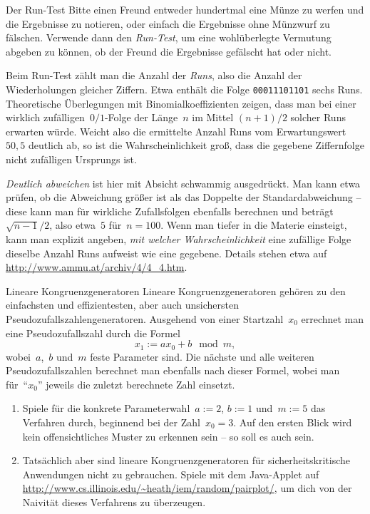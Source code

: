 \documentclass{zirkelblatt}
\begin{document}
\begin{aufgabeShaded}{Der Run-Test}
Bitte einen Freund entweder hundertmal eine Münze zu werfen und die
Ergebnisse zu notieren, oder einfach die Ergebnisse ohne Münzwurf zu fälschen.
Verwende dann den \emph{Run-Test}, um eine wohlüberlegte Vermutung abgeben zu können,
ob der Freund die Ergebnisse gefälscht hat oder nicht.

Beim Run-Test zählt man die Anzahl der \emph{Runs}, also die Anzahl der Wiederholungen
gleicher Ziffern. Etwa enthält die Folge \texttt{00011101101} sechs Runs.
Theoretische Überlegungen mit Binomialkoeffizienten zeigen, dass man bei einer
wirklich zufälligen~$0/1$-Folge der Länge~$n$ im Mittel $(n+1)/2$ solcher Runs
erwarten würde. Weicht also die ermittelte Anzahl Runs vom
Erwartungswert~$50{,}5$ deutlich ab, so ist die Wahrscheinlichkeit groß, dass
die gegebene Ziffernfolge nicht zufälligen Ursprungs ist.

\emph{Deutlich abweichen} ist hier mit Absicht schwammig ausgedrückt. Man kann
etwa prüfen, ob die Abweichung größer ist als das Doppelte der Standardabweichung
-- diese kann man für wirkliche Zufallsfolgen ebenfalls berechnen und
beträgt~$\sqrt{n-1}/2$, also etwa~$5$ für~$n = 100$. Wenn man tiefer in die Materie einsteigt, kann man explizit
angeben, \emph{mit welcher Wahrscheinlichkeit} eine zufällige Folge dieselbe
Anzahl Runs aufweist wie eine gegebene. Details stehen etwa auf
\url{http://www.ammu.at/archiv/4/4_4.htm}.
\end{aufgabeShaded}

\begin{aufgabeShaded}{Lineare Kongruenzgeneratoren}
Lineare Kongruenzgeneratoren gehören zu den einfachsten und effizientesten,
aber auch unsichersten Pseudozufallszahlengeneratoren. Ausgehend von einer
Startzahl~$x_0$ errechnet man eine Pseudozufallszahl durch die Formel
\[ x_1 := ax_0 + b \mod m, \]
wobei~$a$,~$b$ und~$m$ feste Parameter sind. Die nächste und alle weiteren
Pseudozufallszahlen berechnet man ebenfalls nach dieser Formel, wobei man
für~"`$x_0$"' jeweils die zuletzt berechnete Zahl einsetzt.
\begin{enumerate}
\item Spiele für die konkrete Parameterwahl~$a := 2$, $b := 1$ und~$m := 5$ das
Verfahren durch, beginnend bei der Zahl~$x_0 = 3$. Auf den ersten Blick wird kein
offensichtliches Muster zu erkennen sein -- so soll es auch sein.
\item Tatsächlich aber sind lineare Kongruenzgeneratoren für
sicherheitskritische Anwendungen nicht zu gebrauchen. Spiele mit dem Java-Applet auf
\url{http://www.cs.illinois.edu/~heath/iem/random/pairplot/}, um dich von der
Naivität dieses Verfahrens zu überzeugen.
\end{enumerate}
\end{aufgabeShaded}
\end{document}
